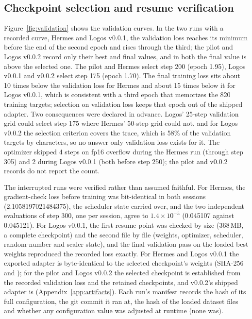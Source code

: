 \subsection{Checkpoint selection and resume verification}
Figure~\ref{fig:validation} shows the validation curves. In the two runs with a recorded curve, Hermes and Logos v0.0.1, the validation loss reaches its minimum before the end of the second epoch and rises through the third; the pilot and Logos v0.0.2 record only their best and final values, and in both the final value is above the selected one. The pilot and Hermes select step 200 (epoch 1.95), Logos v0.0.1 and v0.0.2 select step 175 (epoch 1.70). The final training loss sits about 10 times below the validation loss for Hermes and about 15 times below it for Logos v0.0.1, which is consistent with a third epoch that memorizes the 820 training targets; selection on validation loss keeps that epoch out of the shipped adapter. Two consequences were declared in advance. Logos' 25-step validation grid could select step 175 where Hermes' 50-step grid could not, and for Logos v0.0.2 the selection criterion covers the trace, which is 58\% of the validation targets by characters, so no answer-only validation loss exists for it. The optimizer skipped 4 steps on fp16 overflow during the Hermes run (through step 305) and 2 during Logos v0.0.1 (both before step 250); the pilot and v0.0.2 records do not report the count.

The interrupted runs were verified rather than assumed faithful. For Hermes, the gradient-check loss before training was bit-identical in both sessions (2.1058197021484375), the scheduler state carried over, and the two independent evaluations of step 300, one per session, agree to $1.4 \times 10^{-5}$ (0.045107 against 0.045121). For Logos v0.0.1, the first resume point was checked by size (368\,MB, a complete checkpoint) and the second file by file (weights, optimizer, scheduler, random-number and scaler state), and the final validation pass on the loaded best weights reproduced the recorded loss exactly. For Hermes and Logos v0.0.1 the exported adapter is byte-identical to the selected checkpoint's weights (SHA-256  and ); for the pilot and Logos v0.0.2 the selected checkpoint is established from the recorded validation loss and the retained checkpoints, and v0.0.2's shipped adapter is  (Appendix~\ref{app:artifacts}). Each run's manifest records the hash of its full configuration, the git commit it ran at, the hash of the loaded dataset files and whether any configuration value was adjusted at runtime (none was).
